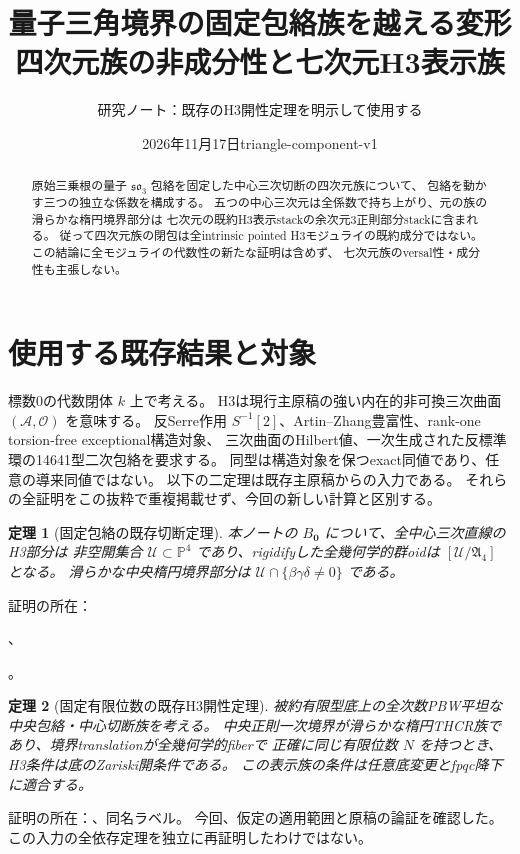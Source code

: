 \documentclass[11pt,a4paper]{ltjsarticle}
\title{量子三角境界の固定包絡族を越える変形\\\large 四次元族の非成分性と七次元H3表示族}
\author{研究ノート：既存のH3開性定理を明示して使用する}
\date{2026年11月17日\quad triangle-component-v1}
\newtheorem{theorem}{定理}[section]
\theoremstyle{remark}\newtheorem{remark}[theorem]{注意}
\begin{document}
\maketitle
\begin{abstract}
原始三乗根の量子 $\mathfrak{so}_3$ 包絡を固定した中心三次切断の四次元族について、
包絡を動かす三つの独立な係数を構成する。
五つの中心三次元は全係数で持ち上がり、元の族の滑らかな楕円境界部分は
七次元の既約H3表示stackの余次元3正則部分stackに含まれる。
従って四次元族の閉包は全intrinsic pointed H3モジュライの既約成分ではない。
この結論に全モジュライの代数性の新たな証明は含めず、
七次元族のversal性・成分性も主張しない。
\end{abstract}
\section{使用する既存結果と対象}
標数0の代数閉体 $k$ 上で考える。
H3は現行主原稿の強い内在的非可換三次曲面
$(\mathcal A,\mathcal O)$ を意味する。
反Serre作用 $S^{-1}[2]$、Artin--Zhang豊富性、rank-one torsion-free exceptional構造対象、
三次曲面のHilbert値、一次生成された反標準環の14641型二次包絡を要求する。
同型は構造対象を保つexact同値であり、任意の導来同値ではない。
以下の二定理は既存主原稿からの入力である。
それらの全証明をこの抜粋で重複掲載せず、今回の新しい計算と区別する。

\begin{theorem}[固定包絡の既存切断定理]\label{thm:quantum-triangle-full-H3}
本ノートの $B_{\boldsymbol0}$ について、全中心三次直線のH3部分は
非空開集合 $\mathcal U\subset\mathbb P^4$ であり、rigidifyした全幾何学的群oidは
$[\mathcal U/\mathfrak A_4]$ となる。
滑らかな中央楕円境界部分は $\mathcal U\cap\{\beta\gamma\delta\ne0\}$ である。
\end{theorem}
証明の所在：\par
\noindent{}、\par
\noindent{}。

\begin{theorem}[固定有限位数の既存H3開性定理]\label{thm:finite-order-relative-H3-open}
被約有限型底上の全次数PBW平坦な中央包絡・中心切断族を考える。
中央正則一次境界が滑らかな楕円THCR族であり、境界translationが全幾何学的fiberで
正確に同じ有限位数 $N$ を持つとき、H3条件は底のZariski開条件である。
この表示族の条件は任意底変更とfpqc降下に適合する。
\end{theorem}
証明の所在：、同名ラベル。
今回、仮定の適用範囲と原稿の論証を確認した。
この入力の全依存定理を独立に再証明したわけではない。
\end{document}
